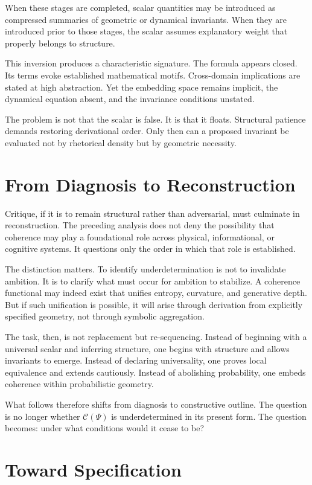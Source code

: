 \documentclass[12pt]{article}
\begin{document}
When these stages are completed, scalar quantities may be introduced as compressed summaries of geometric or dynamical invariants. When they are introduced prior to those stages, the scalar assumes explanatory weight that properly belongs to structure.

This inversion produces a characteristic signature. The formula appears closed. Its terms evoke established mathematical motifs. Cross-domain implications are stated at high abstraction. Yet the embedding space remains implicit, the dynamical equation absent, and the invariance conditions unstated.

The problem is not that the scalar is false. It is that it floats. Structural patience demands restoring derivational order. Only then can a proposed invariant be evaluated not by rhetorical density but by geometric necessity.

\section{From Diagnosis to Reconstruction}

Critique, if it is to remain structural rather than adversarial, must culminate in reconstruction. The preceding analysis does not deny the possibility that coherence may play a foundational role across physical, informational, or cognitive systems. It questions only the order in which that role is established.

The distinction matters. To identify underdetermination is not to invalidate ambition. It is to clarify what must occur for ambition to stabilize. A coherence functional may indeed exist that unifies entropy, curvature, and generative depth. But if such unification is possible, it will arise through derivation from explicitly specified geometry, not through symbolic aggregation.

The task, then, is not replacement but re-sequencing. Instead of beginning with a universal scalar and inferring structure, one begins with structure and allows invariants to emerge. Instead of declaring universality, one proves local equivalence and extends cautiously. Instead of abolishing probability, one embeds coherence within probabilistic geometry.

What follows therefore shifts from diagnosis to constructive outline. The question is no longer whether $\mathcal{C}(\Psi)$ is underdetermined in its present form. The question becomes: under what conditions would it cease to be?

\section{Toward Specification}
\end{document}
